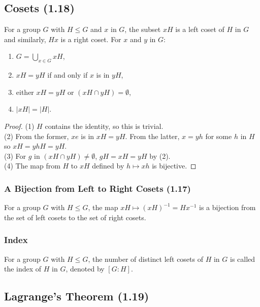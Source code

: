 \subsection{Cosets (1.18)} \label{1.18}

For a group $G$ with $H \leq G$ and $x$ in $G$, the subset $xH$ is a left
coset of $H$ in $G$ and similarly, $Hx$ is a right coset. 
For $x$ and $y$ in $G$: \begin{enumerate}
    \item $G = \bigcup_{x \in G} xH$,
    \item $xH = yH$ if and only if $x$ is in $yH$,
    \item either $xH = yH$ or $(xH \cap yH) = \emptyset$,
    \item $|xH| = |H|$.
\end{enumerate}

\begin{proof}
    (1) $H$ contains the identity, so this is trivial. \\[\baselineskip]
    (2) From the former, $xe$ is in $xH = yH$. From the latter, $x = yh$ for
    some $h$ in $H$ so $xH = yhH = yH$. \\[\baselineskip]
    (3) For $g$ in $(xH \cap yH) \neq \emptyset$, $gH = xH = yH$ by (2). \\[\baselineskip]
    (4) The map from $H$ to $xH$ defined by $h \mapsto xh$ is bijective.
\end{proof}

\subsubsection{A Bijection from Left to Right Cosets (1.17)} \label{1.17}

For a group $G$ with $H \leq G$, the map $xH \mapsto (xH)^{-1} = Hx^{-1}$ is a 
bijection from the set of left cosets to the set of right cosets.

\subsubsection{Index}

For a group $G$ with $H \leq G$, the number of distinct left cosets of $H$
in $G$ is called the index of $H$ in $G$, denoted by $[G : H]$.

\subsection{Lagrange's Theorem (1.19)} \label{1.19}

